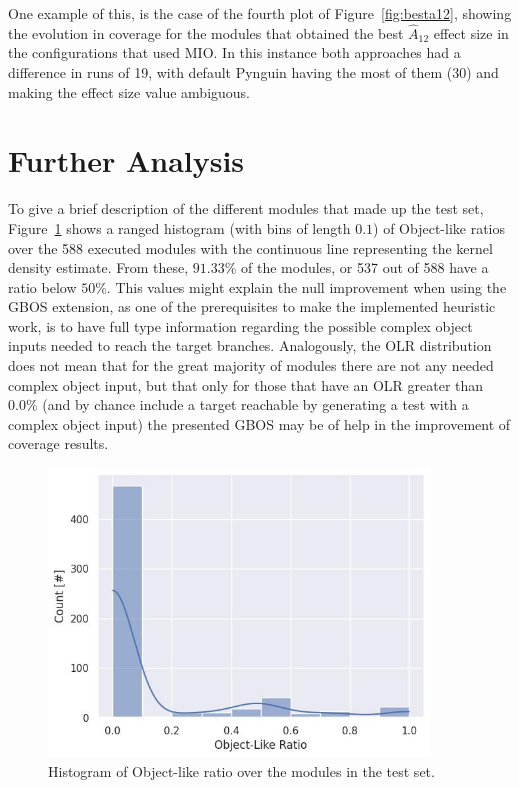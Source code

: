 \documentclass[%
  chapterprefix=false,%
  open=right,%
  twoside=true,%
  paper=a4,%
  logofile={Figures/logo.png},%
  thesistype=master,%
  UKenglish,%
]{se2thesis}
\begin{document}
One example of this, is the case of the fourth plot of Figure~\ref{fig:besta12}, showing the evolution in coverage for the modules that obtained the best \(\hat{A}_{12}\) effect size in the configurations that used MIO.\@
In this instance both approaches had a difference in runs of 19, with default Pynguin having the most of them (30) and making the effect size value ambiguous. 

\newpage

\section{Further Analysis}\label{sec:further}

To give a brief description of the different modules that made up the test set, Figure~\ref{fig:olr-hist} shows a ranged histogram (with bins of length \(0.1\)) of Object-like ratios over the 588 executed modules with the continuous line representing the kernel density estimate.
From these, \(91.33\%\) of the modules, or 537 out of 588 have a ratio below \(50\%\).
This values might explain the null improvement when using the GBOS extension, as one of the prerequisites to make the implemented heuristic work, is to have full type information regarding the possible complex object inputs needed to reach the target branches.
Analogously, the OLR distribution does not mean that for the great majority of modules there are not any needed complex object input, but that only for those that have an OLR greater than \(0.0\%\) (and by chance include a target reachable by generating a test with a complex object input) the presented GBOS may be of help in the improvement of coverage results.

\begin{figure}[bth]
  \centering
  \includegraphics[width=0.9\textwidth]{Figures/Results/olr-hist.jpg}
  \caption{Histogram of Object-like ratio over the modules in the test set.}\label{fig:olr-hist}
\end{figure}
\end{document}
